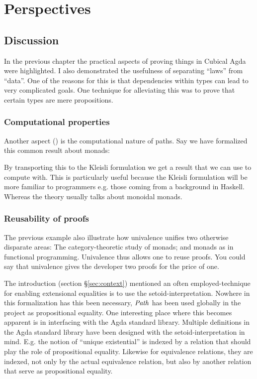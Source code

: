 \chapter{Perspectives}
\section{Discussion}
In the previous chapter the practical aspects of proving things in Cubical Agda
were highlighted. I also demonstrated the usefulness of separating ``laws'' from
``data''. One of the reasons for this is that dependencies within types can lead
to very complicated goals. One technique for alleviating this was to prove that
certain types are mere propositions.

\subsection{Computational properties}
Another aspect () is the computational nature of paths. Say we have
formalized this common result about monads:


By transporting this to the Kleisli formulation we get a result that we can use
to compute with. This is particularly useful because the Kleisli formulation
will be more familiar to programmers e.g. those coming from a background in
Haskell. Whereas the theory usually talks about monoidal monads.


\subsection{Reusability of proofs}
The previous example also illustrate how univalence unifies two otherwise
disparate areas: The category-theoretic study of monads; and monads as in
functional programming. Univalence thus allows one to reuse proofs. You could
say that univalence gives the developer two proofs for the price of one.

The introduction (section \S\ref{sec:context}) mentioned an often
employed-technique for enabling extensional equalities is to use the
setoid-interpretation. Nowhere in this formalization has this been necessary,
$\Path$ has been used globally in the project as propositional equality. One
interesting place where this becomes apparent is in interfacing with the Agda
standard library. Multiple definitions in the Agda standard library have been
designed with the setoid-interpretation in mind. E.g. the notion of ``unique
existential'' is indexed by a relation that should play the role of
propositional equality. Likewise for equivalence relations, they are indexed,
not only by the actual equivalence relation, but also by another relation that
serve as propositional equality.

